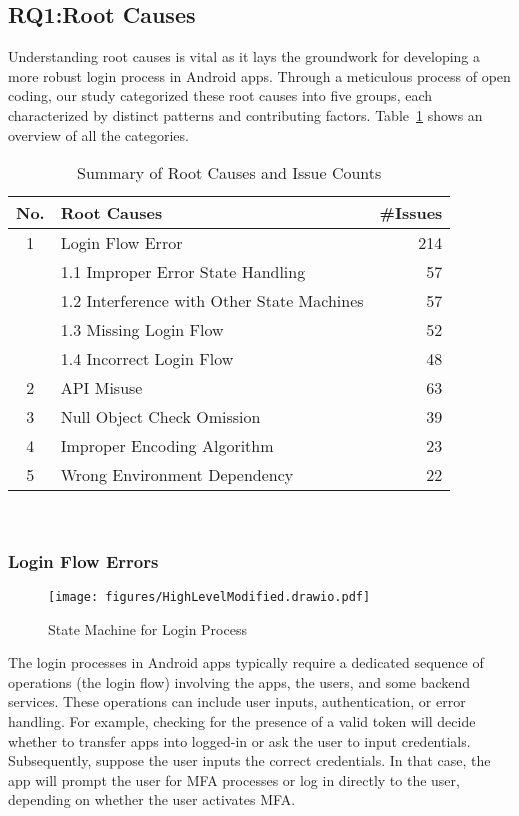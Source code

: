 \subsection{RQ1:Root Causes}
Understanding root causes is vital as it lays the groundwork for developing a more robust login process in Android apps.
Through a meticulous process of open coding, our study categorized these root causes into five groups, each characterized by distinct patterns and contributing factors. Table~\ref{tab:root-causes} shows an overview of all the categories.
\begin{table}
  \centering
  \caption{Summary of Root Causes and Issue Counts }
  \label{tab:root-causes}
   \begin{tabular}{@{}c l r@{}}
    \toprule
    \textbf{No.} & \textbf{Root Causes }& \multicolumn{1}{c}{\textbf{\#Issues}} \\
    \midrule
    1 & Login Flow Error & 214 \\ %
     & 1.1 Improper Error State Handling & 57  \\ 
     & 1.2 Interference with Other State Machines & 57   \\
     & 1.3 Missing Login Flow & 52 \\
     & 1.4 Incorrect Login Flow & 48  \\
    2 & API Misuse & 63  \\
    3 & Null Object Check Omission & 39 \\
    4 & Improper Encoding Algorithm & 23 \\
    5 & Wrong Environment Dependency & 22 \\
    \bottomrule
  \end{tabular}\\
\end{table}


\subsubsection{Login Flow Errors}
\begin{figure*}[ht!]
  \centering
  \texttt{[image: figures/HighLevelModified.drawio.pdf]}
  \caption{State Machine for Login Process}
  \label{fig:statemachine}
\end{figure*}
The login processes in Android apps typically require a dedicated sequence of operations (the login flow) involving the apps, the users, and some backend services. These operations can include user inputs, authentication, or error handling. For example, checking for the presence of a valid token will decide whether to transfer apps into logged-in or ask the user to input credentials. Subsequently, suppose the user inputs the correct credentials. In that case, the app will prompt the user for MFA processes or log in directly to the user, depending on whether the user activates MFA. 

